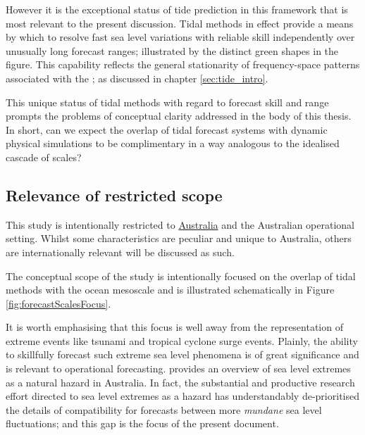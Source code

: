 However it is the exceptional status of tide prediction in this framework that is most relevant to the present discussion.  Tidal methods in effect provide a means by which to resolve fast sea level variations with reliable skill independently over unusually long forecast ranges; illustrated by the distinct green shapes in the figure.    This capability reflects the general stationarity of frequency-space patterns associated with the \ATGP{}; as discussed in chapter \ref{sec:tide_intro}.

This unique status of tidal methods with regard to forecast skill and range prompts the problems of conceptual clarity addressed in the body of this thesis.  In short, can we expect the overlap of tidal forecast systems with dynamic physical simulations to be complimentary in a way analogous to the idealised cascade of scales?
\subsection{Relevance of restricted scope}
This study is intentionally restricted to \underline{Australia} and the Australian operational setting.  Whilst some characteristics are peculiar and unique to Australia, others are internationally relevant will be discussed as such.


The conceptual scope of the study is intentionally focused on the overlap of tidal methods with the ocean mesoscale and is illustrated schematically in Figure \ref{fig:forecastScalesFocus}.


It is worth emphasising that this focus is well away from the representation of extreme events like tsunami and tropical cyclone surge events.   Plainly, the ability to skillfully forecast such extreme sea level phenomena is of great significance and is relevant to operational forecasting. \citet{McInnes:2016km} provides an overview of sea level extremes as a natural hazard in Australia.    
In fact, the substantial and productive research effort directed to sea level extremes as a hazard has understandably de-prioritised the details of compatibility for forecasts between more \emph{mundane} sea level fluctuations; and this gap is the focus of the present document. 


